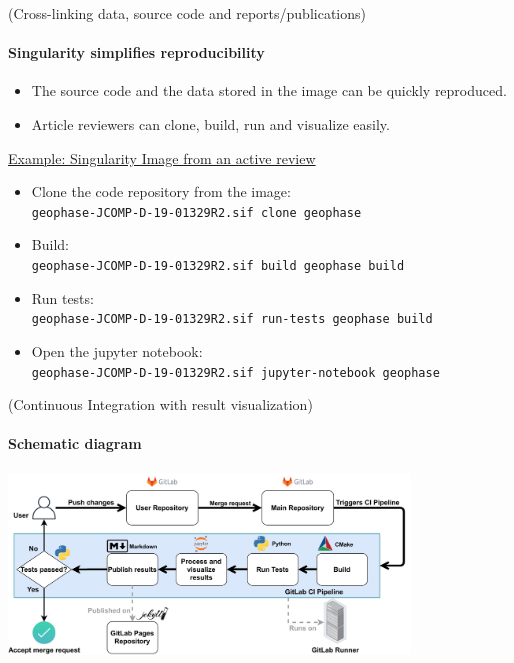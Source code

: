 \documentclass[
	aspectratio=169,%
	color={accentcolor=2d},
	logo=true,%
	colorframetitle=true,%
	]{tudabeamer}
\begin{document}
\begin{frame}{(Cross-linking data, source code and reports/publications)} 
    \framesubtitle{Singularity simplifies reproducibility}

    \begin{itemize}
        \item The source code and the data stored in the image can be quickly reproduced.
        \item Article reviewers can clone, build, run and visualize easily. 
    \end{itemize}

    \href{https://git.rwth-aachen.de/leia/geophase/-/blob/JCOMP-D-19-01329R2/geophase.def}{Example: Singularity Image from an active review}
    \begin{itemize}
        \item Clone the code repository from the image: \\ \texttt{geophase-JCOMP-D-19-01329R2.sif clone geophase}
        \item Build: \\ \texttt{geophase-JCOMP-D-19-01329R2.sif build geophase build}
        \item Run tests: \\ \texttt{geophase-JCOMP-D-19-01329R2.sif run-tests geophase build}
        \item Open the jupyter notebook: \\ \texttt{geophase-JCOMP-D-19-01329R2.sif jupyter-notebook geophase}
    \end{itemize}

\end{frame}

\begin{frame}{(Continuous Integration with result visualization)} 
	\framesubtitle{Schematic diagram}

	\centering
	\includegraphics[width=0.8\textwidth]{figures/ZINF-CI-diagram.pdf}

\end{frame}
\end{document}
